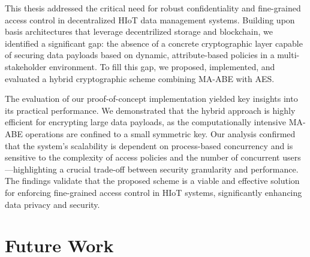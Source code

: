 \documentclass[cic,tc,english]{iiufrgs}
\numberwithin{algorithm}{chapter}
\begin{document}
    This thesis addressed the critical need for robust confidentiality and fine-grained access control in decentralized HIoT data management systems. Building upon basis architectures that leverage decentrilized storage and blockchain, we identified a significant gap: the absence of a concrete cryptographic layer capable of securing data payloads based on dynamic, attribute-based policies in a multi-stakeholder environment. To fill this gap, we proposed, implemented, and evaluated a hybrid cryptographic scheme combining MA-ABE with AES.

    The evaluation of our proof-of-concept implementation yielded key insights into its practical performance. We demonstrated that the hybrid approach is highly efficient for encrypting large data payloads, as the computationally intensive MA-ABE operations are confined to a small symmetric key. Our analysis confirmed that the system's scalability is dependent on process-based concurrency and is sensitive to the complexity of access policies and the number of concurrent users—highlighting a crucial trade-off between security granularity and performance. The findings validate that the proposed scheme is a viable and effective solution for enforcing fine-grained access control in HIoT systems, significantly enhancing data privacy and security.

    \section{Future Work}
    \label{sec:futurework}
\end{document}
